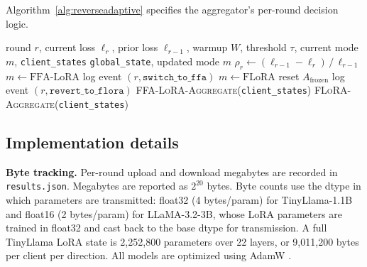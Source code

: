 \documentclass[pdflatex,sn-nature,lineno]{sn-jnl}
\begin{document}
Algorithm~\ref{alg:reverseadaptive} specifies the aggregator's per-round decision logic.

\begin{algorithm}[t]
\centering
\caption{ReverseAdaptive aggregator (per round)}
\label{alg:reverseadaptive}
\small
\begin{algorithmic}[1]
\Require round $r$, current loss $\ell_r$, prior loss $\ell_{r-1}$,
         warmup $W$, threshold $\tau$, current mode $m$, \texttt{client\_states}
\Ensure \texttt{global\_state}, updated mode $m$
\State $\rho_r \leftarrow (\ell_{r-1} - \ell_r) \,/\, \ell_{r-1}$ 
    \State $m \leftarrow \text{FFA-LoRA}$
    \State log event $(r, \texttt{switch\_to\_ffa})$
 
    \State $m \leftarrow \text{FLoRA}$
    \State reset $A_{\text{frozen}}$
    \State log event $(r, \texttt{revert\_to\_flora})$
\EndIf
{}
    \State \Return \textsc{FFA-LoRA-Aggregate}(\texttt{client\_states})
\Else
    \State \Return \textsc{FLoRA-Aggregate}(\texttt{client\_states})
\EndIf
\end{algorithmic}
\end{algorithm}

\subsection{Implementation details}
\label{sec:implementation}
\textbf{Byte tracking.}
Per-round upload and download megabytes are recorded in \texttt{results.json}. Megabytes are reported as $2^{20}$ bytes. Byte counts use the dtype in which parameters are transmitted: float32 (4 bytes/param) for TinyLlama-1.1B and float16 (2 bytes/param) for LLaMA-3.2-3B, whose LoRA parameters are trained in float32 and cast back to the base dtype for transmission. A full TinyLlama LoRA state is 2{,}252{,}800 parameters over 22 layers, or 9{,}011{,}200 bytes per client per direction. All models are optimized using AdamW \cite{loshchilov2019decoupled}.
\end{document}
